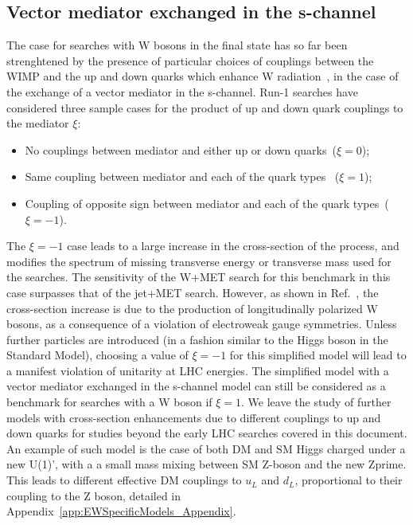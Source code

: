 
\subsection{Vector mediator exchanged in the s-channel}

The case for searches with W bosons in the final state has so far been strenghtened by the 
presence of particular choices of couplings between the WIMP and the up and 
down quarks which enhance W radiation~\cite{Bai:2012xg}, in the case of the exchange
of a vector mediator in the s-channel. 
Run-1 searches have considered three sample cases for the product of 
up and down quark couplings to the mediator $\xi$:
\begin{itemize}
 \item No couplings between mediator and either up or down quarks~($\xi=0$);
 \item Same coupling between mediator and each of the quark types~ ($\xi=1$);
 \item Coupling of opposite sign between mediator and each of the quark types~($\xi=-1$). 
\end{itemize}
The $\xi=-1$ case leads to a large increase in the cross-section of the process,
and modifies the spectrum of missing transverse energy or 
transverse mass used for the searches. The sensitivity of the W+MET search for 
this benchmark in this case surpasses that of the jet+MET search. 
However, as shown in Ref.~\cite{Bell:2015sza}, the cross-section increase is due
to the production of longitudinally polarized W bosons, 
as a consequence of a violation of electroweak gauge symmetries. Unless further
particles are introduced (in a fashion similar
to the Higgs boson in the Standard Model), choosing a value of $\xi=-1$ 
for this simplified model will lead to a manifest violation of unitarity at LHC energies. 
The simplified model with a vector mediator exchanged in the s-channel model 
can still be considered as a benchmark for searches with a W boson if $\xi=1$. 
We leave the study of further models with cross-section enhancements due
to different couplings to up and down quarks for studies beyond the early LHC searches
covered in this document. 
An example of such model is the case of both DM and SM Higgs charged under a new U(1)',
with a a small mass mixing between SM Z-boson and the new Zprime. This leads
to different effective DM couplings to $u_L$ and $d_L$, proportional to
their coupling to the Z boson, detailed in Appendix~\ref{app:EWSpecificModels_Appendix}.

